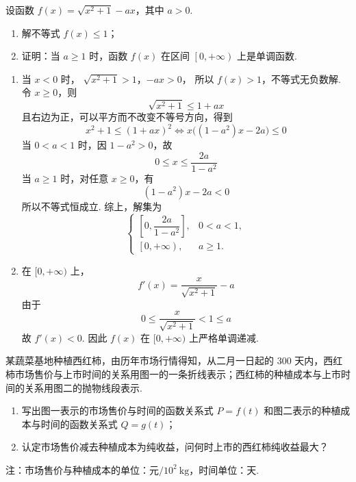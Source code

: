\begin{problem}
设函数 \(f(x) = \sqrt{x^2 + 1} - ax\)，其中 \(a > 0\).

\begin{enumerate}
\item 解不等式 \(f(x) \leqslant 1\)；
\item 证明：当 \(a \geqslant 1\) 时，函数 \(f(x)\) 在区间 \(\left[0,+\infty\right)\) 上是单调函数.
\end{enumerate}
\end{problem}

\begin{solution}
\begin{enumerate}
\item 当 \(x<0\) 时，
\(\sqrt{x^2+1}>1\)，\(-ax>0\)，
所以 \(f(x)>1\)，不等式无负数解. 令 \(x\geqslant0\)，则
\[
\sqrt{x^2+1}\leqslant1+ax
\]
且右边为正，可以平方而不改变不等号方向，得到
\[
x^2+1\leqslant(1+ax)^2
\iff x\bigl((1-a^2)x-2a\bigr)\leqslant0
\]
当 \(0<a<1\) 时，因 \(1-a^2>0\)，故
\[
0\leqslant x\leqslant\frac{2a}{1-a^2}
\]
当 \(a\geqslant1\) 时，对任意 \(x\geqslant0\)，有
\[
(1-a^2)x-2a<0
\]
所以不等式恒成立. 综上，解集为
\[
\begin{cases}
\left[0,\dfrac{2a}{1-a^2}\right],&0<a<1,\\[6pt]
\left[0,+\infty\right),&a\geqslant1.
\end{cases}
\]
\item 在 \([0,+\infty)\) 上，
\[
f'(x)=\frac{x}{\sqrt{x^2+1}}-a
\]
由于
\[
0\leqslant\frac{x}{\sqrt{x^2+1}}<1\leqslant a
\]
故 \(f'(x)<0\). 因此 \(f(x)\) 在 \([0,+\infty)\) 上严格单调递减.
\end{enumerate}
\end{solution}

\begin{problem}
某蔬菜基地种植西红柿，由历年市场行情得知，从二月一日起的 \(300\) 天内，西红柿市场售价与上市时间的关系用图一的一条折线表示；西红柿的种植成本与上市时间的关系用图二的抛物线段表示.

\begin{enumerate}
\item 写出图一表示的市场售价与时间的函数关系式 \(P = f(t)\) 和图二表示的种植成本与时间的函数关系式 \(Q = g(t)\)；
\item 认定市场售价减去种植成本为纯收益，问何时上市的西红柿纯收益最大？
\end{enumerate}

注：市场售价与种植成本的单位：\(\text{元}/10^{2}\mathrm{~kg}\)，时间单位：\(\text{天}\).

\end{problem}

